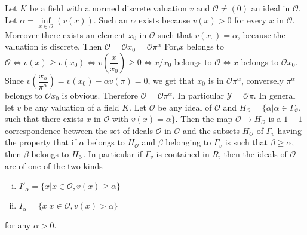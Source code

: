 Let $K$ be a field with a normed discrete valuation $v$ and
$\mathscr{O} \neq (0)$ an ideal in $\mathscr{O}$.  Let $\alpha =
\inf\limits_{x \in \mathscr{O}} (v(x))$. Such an $\alpha$ exists
because $v(x) > 0 $ for every $x$ in $\mathscr{O}$. Moreover there
exists an element $x_0$ in $\mathscr{O}$ such that $v
(x_\circ)= \alpha$, because the valuation is discrete. Then
$\mathscr{O} = \mathscr{O}x_0 = \mathscr{O} 
\pi^\alpha$ For,\pageoriginale $x$ belongs to $\mathscr{O}
\Longleftrightarrow v(x) 
\geq v(x_0)\Longleftrightarrow v (\dfrac{x}{x_0}) \geq 0
\Longleftrightarrow x/x_0$ belongs to $\mathscr{O} \Longleftrightarrow
x $ belongs to $\mathscr{O}x_0$. Since $v (\dfrac{x_o}{\pi^\alpha}) =
v(x_0)- \alpha v (\pi )= 0 $, we get that $x_0$ is in $\mathscr{O}
\pi^\alpha$, conversely $\pi^\alpha$ belongs to $\mathscr{O} x_0$ is
obvious. Therefore $\mathscr{O} = \mathscr{O} \pi^\alpha $. In
particular $\mathscr{Y}= \mathscr{O} \pi $. In general let $v$ be any
valuation of a field $K$.  Let $\mathscr{O}$ be any ideal of
$\mathscr{O}$ and $H_\mathscr{O} = \{ \alpha | \alpha \in
\Gamma_\vartheta$, such that there exists $x$ in $\mathscr{O}$ with
$v(x)= \alpha \}$. Then the map $\mathscr{O} \to H_{\mathscr{O}}$ is a
$1 - 1$ correspondence between the set of ideals $\mathscr{O}$ in
$\mathscr{O}$ and the subsets $H_{\mathscr{O}}$ of $\Gamma_v$ having
the property that if $\alpha$ belongs to $H_{\mathscr{O}}$ and $\beta$
belonging to $\Gamma_v$ is such that $\beta \geq \alpha$, then $\beta$
belongs to $H_\mathscr{O}$. In particular if $\Gamma_v$ is contained
in $R$, then the ideals of $\mathscr{O}$ are of one of the two  kinds 
\begin{enumerate}[(i)]
\item $I'_\alpha = \{ x | x \in \mathscr{O}, v (x) \geq \alpha \}$
\item $I_\alpha = \{ x | x \in \mathscr{O}, v (x) > \alpha \}$
\end{enumerate}
for any $\alpha > 0$.

